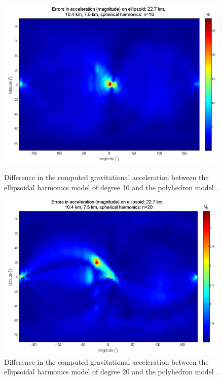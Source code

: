 \begin{figure}[h]
\begin{minipage}[t]{0.5\textwidth}
\centering
\includegraphics[width=\textwidth]{ellipsoidal_10_comparison.png}
\caption{Difference in the computed gravitational acceleration between the ellipsoidal harmonics model of degree 10 and the polyhedron model \cite{spherical_ellipsoidal_comparison}.}
\label{fig:ellipsoidal_10_comparison}
\end{minipage}
\hspace{0.5cm}
\begin{minipage}[t]{0.5\textwidth}
\centering
\includegraphics[width=\textwidth]{ellipsoidal_20_comparison.png}
\caption{Difference in the computed gravitational acceleration between the ellipsoidal harmonics model of degree 20 and the polyhedron model \cite{spherical_ellipsoidal_comparison}.}
\label{fig:ellipsoidal_20_comparison}
\end{minipage}
\end{figure}

